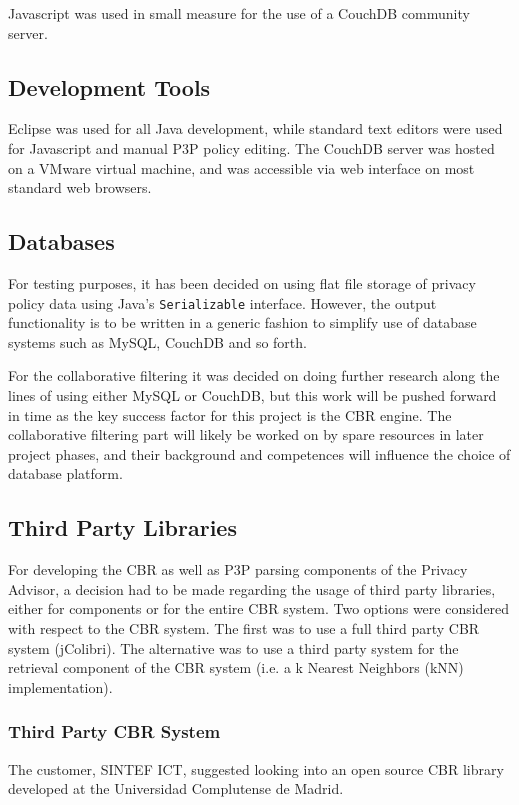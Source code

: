 Javascript was used in small measure for the use of a CouchDB community server.

\subsection{Development Tools}
Eclipse was used for all Java development, while standard text editors were used for Javascript and manual P3P policy editing. The CouchDB server was hosted on a VMware virtual machine, and was accessible via web interface on most standard web browsers.

\subsection{Databases}
For testing purposes, it has been decided on using flat file storage of privacy policy data using Java's \texttt{Serializable} interface. However, the output functionality is to be written in a generic fashion to simplify use of database systems such as MySQL, CouchDB and so forth. 

For the collaborative filtering it was decided on doing further research along the lines of using either MySQL or CouchDB, but this work will be pushed forward in time as the key success factor for this project is the CBR engine. The collaborative filtering part will likely be worked on by spare resources in later project phases, and their background and competences will influence the choice of database platform.

\subsection{Third Party Libraries}
 
For developing the CBR as well as P3P parsing components of the Privacy Advisor, a decision had to be made regarding the usage of third party libraries, either for components or for the entire CBR system. Two options were considered with respect to the CBR system. The first was to use a full third party CBR system (jColibri). The alternative was to use a third party system for the retrieval component of the CBR system (i.e. a k Nearest Neighbors (kNN) implementation).


\subsubsection{Third Party CBR System}

The customer, SINTEF ICT, suggested looking into an open source CBR library developed at the Universidad Complutense de Madrid.
 
